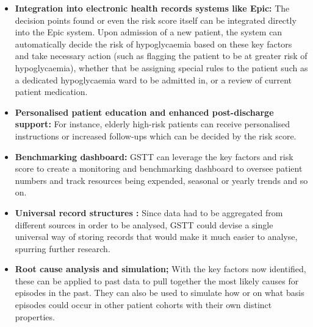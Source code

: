 	\begin{itemize}
		\item \textbf{Integration into electronic health records systems like Epic:} The decision points found or even the risk score itself can be integrated directly into the Epic system. Upon admission of a new patient, the system can automatically decide the risk of hypoglycaemia based on these key factors and take necessary action (such as flagging the patient to be at greater risk of hypoglycaemia), whether that be assigning special rules to the patient such as a dedicated hypoglycaemia ward to be admitted in, or a review of current patient medication.
		\item \textbf{Personalised patient education and enhanced post-discharge support: } For instance, elderly high-risk patients can receive personalised instructions or increased follow-ups which can be decided by the risk score.
		\item \textbf{Benchmarking dashboard: } GSTT can leverage the key factors and risk score to create a monitoring and benchmarking dashboard to oversee patient numbers and track resources being expended, seasonal or yearly trends and so on. 
		\item \textbf{Universal record structures : } Since data had to be aggregated from different sources in order to be analysed, GSTT could devise a single universal way of storing records that would make it much easier to analyse, spurring further research.
		\item \textbf{Root cause analysis and simulation; } With the key factors now identified, these can be applied to past data to pull together the most likely causes for episodes in the past. They can also be used to simulate how or on what basis episodes could occur in other patient cohorts with their own distinct properties.
	\end{itemize}